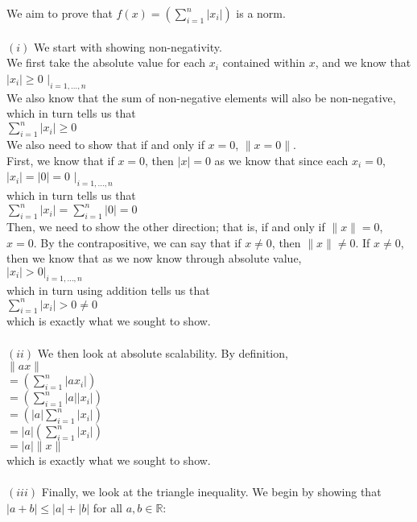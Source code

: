 \documentclass{article}
\newcommand{\field}[1]{\mathbb{#1}}
\newcommand{\1}{\mathbf{1}}
\newcommand{\R}{\field{R}} %
\begin{document}
{We aim to prove that $f(x) = \left( \sum_{i=1}^n |x_i| \right)$ is a norm. \\ \\
$(i)$ We start with showing non-negativity. \\
We first take the absolute value for each $x_i$ contained within $x$, and we know that \\
$|x_i| \geq 0$ $|_{i = 1, \dots, n}$ \\
We also know that the sum of non-negative elements will also be non-negative, which in turn tells us that \\ 
$\sum_{i=1}^{n} |x_i| \geq 0$ \\
We also need to show that if and only if $x = 0$, $\|x = 0\|$. \\
First, we know that if $x = 0$, then $|x| = 0$ as we know that since each $x_i = 0$,  \\
$|x_i| = |0| = 0$ $|_{i = 1, \dots, n}$ \\
which in turn tells us that \\ 
$\sum_{i=1}^{n} |x_i| = \sum_{i=1}^{n} |0| = 0$ \\
Then, we need to show the other direction; that is, if and only if $\|x\| = 0$, $x = 0$. By the contrapositive, we can say that if $x \neq 0$, then $\|x\| \neq 0$. If $x \neq 0$, then we know that as we now know through absolute value, \\
$|x_i| > 0 |_{i = 1, \dots, n}$ \\
which in turn using addition tells us that  \\ 
$\sum_{i=1}^{n} |x_i| > 0 \neq 0$ \\
which is exactly what we sought to show. \\ \\
$(ii)$ We then look at absolute scalability. By definition, \\
$\|ax\| $ \\
$ = (\sum_{i=1}^{n} |ax_i|)$ \\
$ = (\sum_{i=1}^{n} |a| |x_i|)$ \\
$ = (|a| \sum_{i=1}^{n} |x_i|)$ \\
$ = |a| (\sum_{i=1}^{n} |x_i|)$ \\
$ = |a| \|x\|$ \\
which is exactly what we sought to show. \\ \\
$(iii)$ Finally, we look at the triangle inequality. We begin by showing that $|a + b| \leq |a| + |b|$ for all $a, b \in \R$: \\
}
\end{document}

